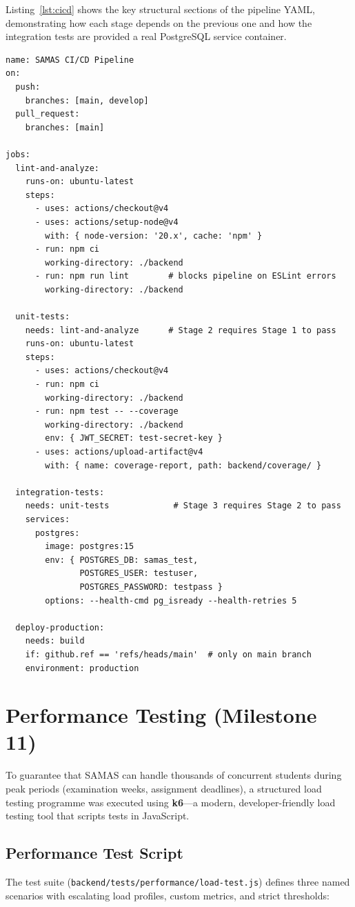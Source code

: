 \documentclass[12pt, a4paper]{report}
\begin{document}
Listing~\ref{lst:cicd} shows the key structural sections of the pipeline YAML, demonstrating how each stage depends on the previous one and how the integration tests are provided a real PostgreSQL service container.

\begin{lstlisting}[style=yaml_style, caption={Excerpt from \texttt{.github/workflows/ci-cd.yml}}, label={lst:cicd}]
name: SAMAS CI/CD Pipeline
on:
  push:
    branches: [main, develop]
  pull_request:
    branches: [main]

jobs:
  lint-and-analyze:
    runs-on: ubuntu-latest
    steps:
      - uses: actions/checkout@v4
      - uses: actions/setup-node@v4
        with: { node-version: '20.x', cache: 'npm' }
      - run: npm ci
        working-directory: ./backend
      - run: npm run lint        # blocks pipeline on ESLint errors
        working-directory: ./backend

  unit-tests:
    needs: lint-and-analyze      # Stage 2 requires Stage 1 to pass
    runs-on: ubuntu-latest
    steps:
      - uses: actions/checkout@v4
      - run: npm ci
        working-directory: ./backend
      - run: npm test -- --coverage
        working-directory: ./backend
        env: { JWT_SECRET: test-secret-key }
      - uses: actions/upload-artifact@v4
        with: { name: coverage-report, path: backend/coverage/ }

  integration-tests:
    needs: unit-tests             # Stage 3 requires Stage 2 to pass
    services:
      postgres:
        image: postgres:15
        env: { POSTGRES_DB: samas_test,
               POSTGRES_USER: testuser,
               POSTGRES_PASSWORD: testpass }
        options: --health-cmd pg_isready --health-retries 5

  deploy-production:
    needs: build
    if: github.ref == 'refs/heads/main'  # only on main branch
    environment: production
\end{lstlisting}

\section{Performance Testing (Milestone 11)}
To guarantee that SAMAS can handle thousands of concurrent students during peak periods (examination weeks, assignment deadlines), a structured load testing programme was executed using \textbf{k6}---a modern, developer-friendly load testing tool that scripts tests in JavaScript.

\subsection{Performance Test Script}
The test suite (\texttt{backend/tests/performance/load-test.js}) defines three named scenarios with escalating load profiles, custom metrics, and strict thresholds:
\end{document}
